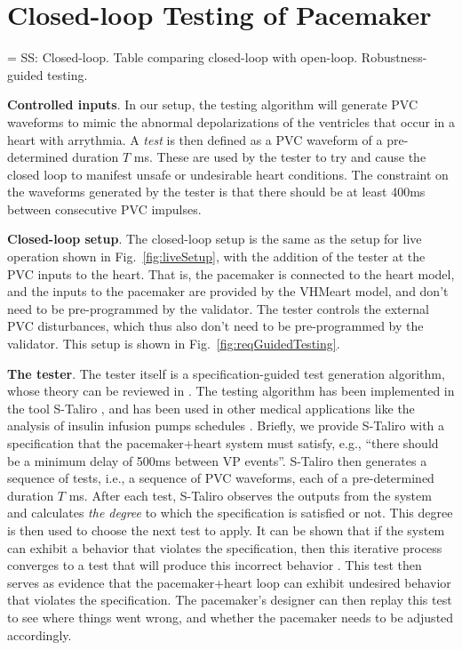 \section{Closed-loop Testing of Pacemaker}
\label{closedloop}

= SS: Closed-loop.
Table comparing closed-loop with open-loop.
Robustness-guided testing.
%

\textbf{Controlled inputs}.
In our setup, the testing algorithm will generate PVC waveforms to mimic the abnormal depolarizations of the ventricles that occur in a heart with arrythmia. 
A \emph{test} is then defined as a PVC waveform of a pre-determined duration $T$ ms.
These are used by the tester to try and cause the closed loop to manifest unsafe or undesirable heart conditions.
The constraint on the waveforms generated by the tester is that there should be at least 400ms between consecutive PVC impulses.

\textbf{Closed-loop setup}.
The closed-loop setup is the same as the setup for live operation shown in Fig.~\ref{fig:liveSetup}, with the addition of the tester at the PVC inputs to the heart.
That is, the pacemaker is connected to the heart model, and the inputs to the pacemaker are provided by the VHMeart model, and don't need to be pre-programmed by the validator. 
The tester controls the external PVC disturbances, which thus also don't need to be pre-programmed by the validator.
This setup is shown in Fig.~\ref{fig:reqGuidedTesting}.

\textbf{The tester}.
The tester itself is a specification-guided test generation algorithm, whose theory can be reviewed in \cite{AbbasFSIG13tecs}.
The testing algorithm has been implemented in the tool S-Taliro \cite{AnnapureddyLFS11tacas}, and has been used in other medical applications like the analysis of insulin infusion pumps schedules \cite{SankaranarayananF2012cmsb}.
Briefly, we provide S-Taliro with a specification that the pacemaker+heart system must satisfy,
e.g., ``there should be a minimum delay of 500ms between VP events''.
S-Taliro then generates a sequence of tests, i.e., a sequence of PVC waveforms, each of a pre-determined duration $T$ ms.
After each test, S-Taliro observes the outputs from the system and calculates \emph{the degree} to which the specification is satisfied or not.
This degree is then used to choose the next test to apply. 
It can be shown that if the system can exhibit a behavior that violates the specification, then this iterative process converges to a test that will produce this incorrect behavior \cite{AbbasF_HybridSA12}. 
This test then serves as evidence that the pacemaker+heart loop can exhibit undesired behavior that violates the specification.
The pacemaker's designer can then replay this test to see where things went wrong, and whether the pacemaker needs to be adjusted accordingly.

